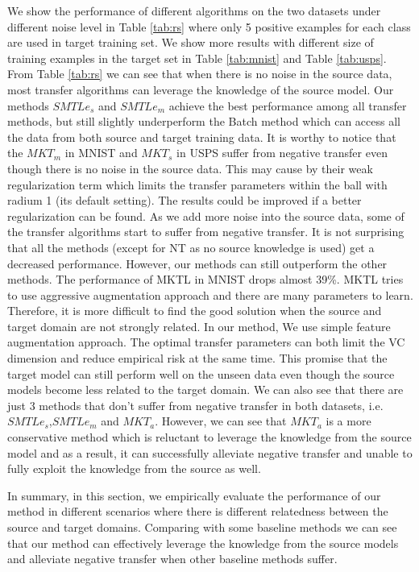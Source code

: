 We show the performance of different algorithms on the two datasets under different noise level in Table \ref{tab:rs} where only 5 positive examples for each class are used in target training set. We show more results with different size of training examples in the target set in Table \ref{tab:mnist} and Table \ref{tab:usps}. From Table \ref{tab:rs} we can see that when there is no noise in the source data, most transfer algorithms can leverage the knowledge of the source model. Our methods $SMTLe_s$ and $SMTLe_m$ achieve the best performance among all transfer methods, but still slightly underperform the Batch method which can access all the data from both source and target training data. It is worthy to notice that the $MKT_m$ in MNIST and $MKT_s$ in USPS suffer from negative transfer even though there is no noise in the source data. This may cause by their weak regularization term which limits the transfer parameters within the ball with radium 1 (its default setting). The results could be improved if a better regularization can be found. As we add more noise into the source data, some of the transfer algorithms start to suffer from negative transfer. It is not surprising that all the methods (except for NT as no source knowledge is used) get a decreased performance. However, our methods can still outperform the other methods. The performance of MKTL in MNIST drops almost 39\%. MKTL tries to use aggressive augmentation approach and there are many parameters to learn. Therefore, it is more difficult to find the good solution when the source and target domain are not strongly related. In our method, We use simple feature augmentation approach. The optimal transfer parameters can both limit the VC dimension and reduce empirical risk at the same time. This promise that the target model can still perform well on the unseen data even though the source models become less related to the target domain. We can also see that there are just 3 methods that don't suffer from negative transfer in both datasets, i.e. $SMTLe_s$,$SMTLe_m$ and $MKT_a$. However, we can see that $MKT_a$ is a more conservative method which is reluctant to leverage the knowledge from the source model and as a result, it can successfully alleviate negative transfer and unable to fully exploit the knowledge from the source as well. 

In summary, in this section, we empirically evaluate the performance of our method in different scenarios where there is different relatedness between the source and target domains. Comparing with some baseline methods we can see that our method can effectively leverage the knowledge from the source models and alleviate negative transfer when other baseline methods suffer.



